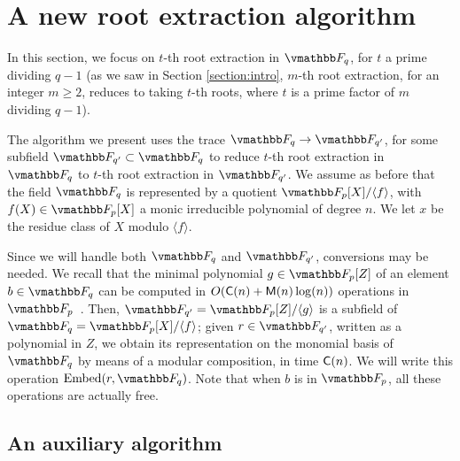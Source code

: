 
\section{A new root extraction algorithm}\label{section:newRootEx}

In this section, we focus on $t$-th root extraction in $\F_q$, for $t$
a prime dividing $q-1$ (as we saw in Section \ref{section:intro},
$m$-th root extraction, for an integer $m \ge 2$, reduces to taking 
$t$-th roots, where $t$ is a prime factor of $m$ dividing $q-1$).

The algorithm we present uses the trace $\F_q \to \F_{q'}$, for some
subfield $\F_{q'} \subset \F_q$ to reduce $t$-th root extraction in
$\F_q$ to $t$-th root extraction in $\F_{q'}$. We assume as before
that the field $\F_q$ is represented by a quotient $\F_p[X] / \langle
f\rangle$, with $f(X) \in \F_p[X]$ a monic irreducible polynomial of
degree $n$. We let $x$ be the residue class of $X$ modulo $\langle
f\rangle$.

Since we will handle both $\F_q$ and $\F_{q'}$, conversions may be
needed. We recall that the minimal polynomial $g \in \F_p[Z]$ of an
element $b \in \F_q$ can be computed in $O(\mathsf{C}(n)+\mathsf{M}(n)\log(n))$
operations in $\F_p$~\cite{Shoup1994}. Then, $\F_{q'}=\F_p[Z]/\langle
g\rangle$ is a subfield of $\F_q=\F_p[X]/\langle f\rangle $; given $r \in
\F_{q'}$, written as a polynomial in $Z$, we obtain its representation
on the monomial basis of $\F_q$ by means of a modular composition, in
time $\mathsf{C}(n)$. We will write this operation ${\rm Embed}(r,\F_q)$.
Note that when $b$ is in $\F_p$, all these operations are actually
free.


\subsection{An auxiliary algorithm}

